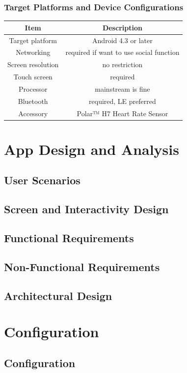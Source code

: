\documentclass[10pt,a4paper,final]{scrartcl}
\begin{document}
\subsubsection{Target Platforms and Device Configurations}
\begin{tabular}{|c|c|}
\hline 
Item & Description \\ 
\hline 
Target platform & Android 4.3 or later \\
Networking & required if want to use social function \\
Screen resolution & no restriction \\
Touch screen & required \\
Processor & mainstream is fine \\
Bluetooth & required, LE preferred \\
Accessory & Polar™ H7 Heart Rate Sensor \\
\hline 
\end{tabular} 
\section{App Design and Analysis}
\subsection{User Scenarios}
	
\subsection{Screen and Interactivity Design}
	
\subsection{Functional Requirements}
	
\subsection{Non-Functional Requirements}
	
\subsection{Architectural Design}
	

\section{Configuration}
\subsection{Configuration}
	
\end{document}
